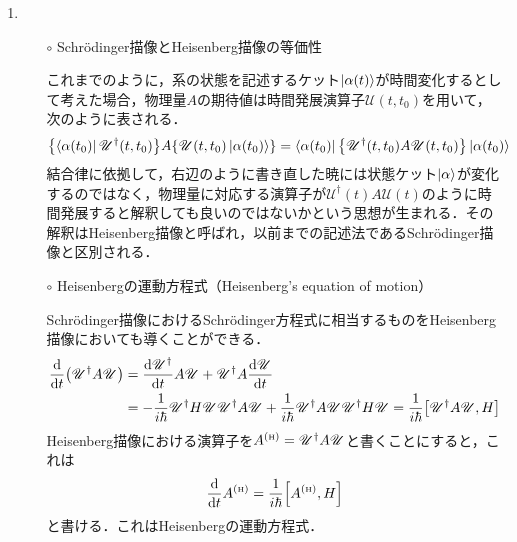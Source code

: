 \documentclass{jarticle}
\begin{document}
\begin{enumerate}
\begin{itemize}
  \end{itemize}

\item {}

  \begin{itemize}

  \item [$\circ$] Schrödinger描像とHeisenberg描像の等価性

    これまでのように，系の状態を記述するケット$\ket{\alpha(t)}$が時間変化するとして考えた場合，物理量$A$の期待値は時間発展演算子$\mathscr{U}(t, t_0)$を用いて，次のように表される．
    \begin{align}
      \qty{\bra{\alpha (t_0)}\mathscr{U}^\dagger(t, t_0)} A \qty{\mathscr{U}(t, t_0)\ket{\alpha (t_0)}} = \bra{\alpha (t_0)}\qty{\mathscr{U}^\dagger(t, t_0) A \mathscr{U}(t, t_0)}\ket{\alpha (t_0)}
    \end{align}
    結合律に依拠して，右辺のように書き直した暁には状態ケット$\ket{\alpha}$が変化するのではなく，物理量に対応する演算子が$\mathscr{U}^\dagger(t) A \mathscr{U}(t)$のように時間発展すると解釈しても良いのではないかという思想が生まれる．その解釈はHeisenberg描像と呼ばれ，以前までの記述法であるSchrödinger描像と区別される．


    
  \item [$\circ$] Heisenbergの運動方程式（Heisenberg's equation of motion）

    Schrödinger描像におけるSchrödinger方程式に相当するものをHeisenberg描像においても導くことができる．
    \begin{align}
      \dv{t} \qty(\mathscr{U}^\dagger A \mathscr{U}) &= \dv{\mathscr{U}^\dagger}{t} A \mathscr{U} + \mathscr{U}^\dagger A \dv{\mathscr{U}}{t} \\
      &= - \frac{1}{i\hbar} \mathscr{U}^\dagger H \mathscr{U} \mathscr{U}^\dagger A \mathscr{U}
      + \frac{1}{i\hbar} \mathscr{U}^\dagger A \mathscr{U} \mathscr{U}^\dagger H \mathscr{U} = \frac{1}{i\hbar}\qty[\mathscr{U}^\dagger A \mathscr{U}, H]
    \end{align}
    Heisenberg描像における演算子を$A^{(\text{{\tiny H}})} = \mathscr{U}^\dagger A \mathscr{U}$と書くことにすると，これは
    \begin{align}
      \dv{t} A^{(\text{{\tiny H}})} = \frac{1}{i\hbar}\qty[A^{(\text{{\tiny H}})}, H]
    \end{align}
    と書ける．これはHeisenbergの運動方程式．
    

\end{itemize}
\end{enumerate}
\end{document}
